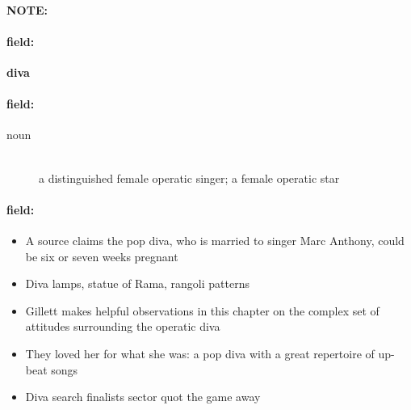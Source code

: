 \documentclass[12pt]{article}
\newenvironment{note}{\paragraph{NOTE:}}{}
\newenvironment{field}{\paragraph{field:}}{}
\begin{document}
\begin{note}
\begin{field}
\textbf{\large diva}
\end{field}


\begin{field}
\begin{description}
\item[noun] \hfill \\ 
a distinguished female operatic singer; a female operatic star

\end{description}
\end{field}

\begin{field}
\begin{itemize}
\item A source claims the pop diva, who is married to singer Marc Anthony, could be six or seven weeks pregnant
\item Diva lamps, statue of Rama, rangoli patterns
\item Gillett makes helpful observations in this chapter on the complex set of attitudes surrounding the operatic diva
\item They loved her for what she was: a pop diva with a great repertoire of up-beat songs
\item Diva search finalists sector quot the game away
\end{itemize}
\end{field}
\end{note}
\end{document}
